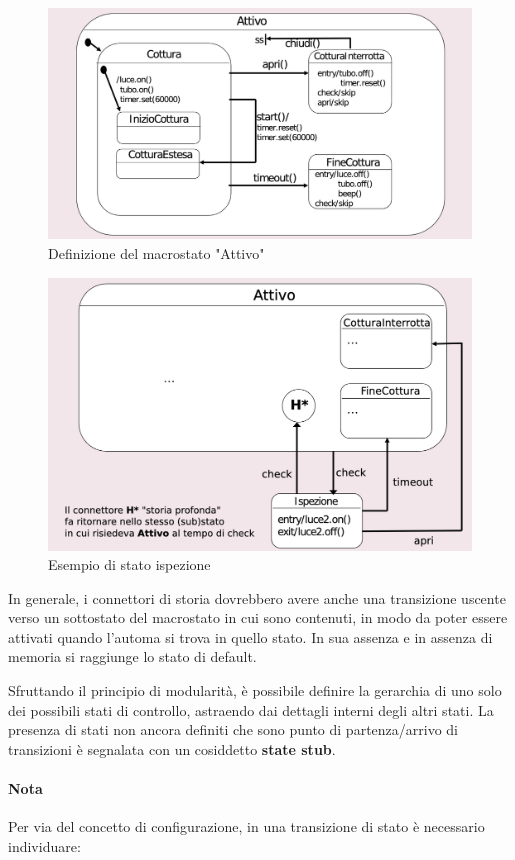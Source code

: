 \begin{figure}[H]
    \centering
    \includegraphics[width=0.75\linewidth]{assets/UML/state/state6.png}
    \caption{Definizione del macrostato "Attivo"}
\end{figure}

\begin{figure}[H]
    \centering
    \includegraphics[width=0.75\linewidth]{assets/UML/state/state7.png}
    \caption{Esempio di stato ispezione}
\end{figure}

In generale, i connettori di storia dovrebbero avere anche una transizione uscente verso un sottostato del macrostato in cui sono contenuti, in modo da poter essere attivati quando l'automa si trova in quello stato. In sua assenza e in assenza di memoria si raggiunge lo stato di default.

Sfruttando il principio di modularità, è possibile definire la gerarchia di uno solo dei possibili stati di controllo, astraendo dai dettagli interni degli altri stati. La presenza di stati non ancora definiti che sono punto di partenza/arrivo di transizioni è segnalata con un cosiddetto \textbf{state stub}.

\paragraph{Nota} Per via del concetto di configurazione, in una transizione di stato è necessario individuare:

